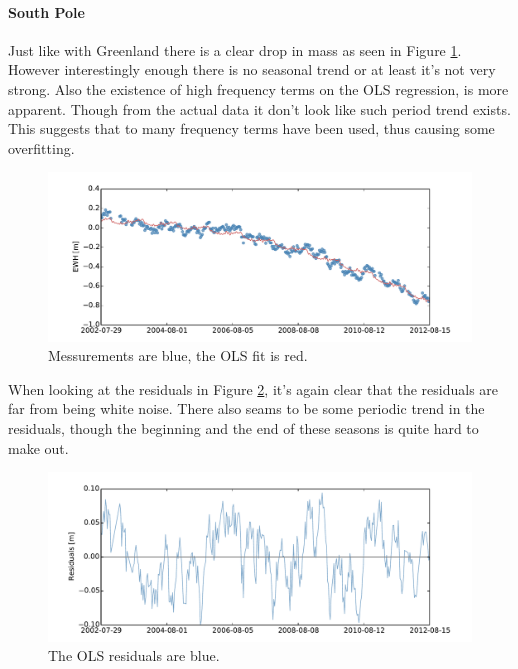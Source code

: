 \paragraph{South Pole}

Just like with Greenland there is a clear drop in mass as seen in Figure \ref{fig:ols-selected-1-fit}. However interestingly enough there is no seasonal trend or at least it's not very strong. Also the existence of high frequency terms on the OLS regression, is more apparent. Though from the actual data it don't look like such period trend exists. This suggests that to many frequency terms have been used, thus causing some overfitting.
\begin{figure}[H]
	\centering
	\includegraphics[width=\textwidth]{figures/ols-selected-1-fit}
	\caption{Messurements are blue, the OLS fit is red.}
	\label{fig:ols-selected-1-fit}
\end{figure}

When looking at the residuals in Figure \ref{fig:ols-selected-1-residual}, it's again clear that the residuals are far from being white noise. There also seams to be some periodic trend in the residuals, though the beginning and the end of these seasons is quite hard to make out. 

\begin{figure}[H]
	\centering
	\includegraphics[width=\textwidth]{figures/ols-selected-1-residual}
	\caption{The OLS residuals are blue.}
	\label{fig:ols-selected-1-residual}
\end{figure}

